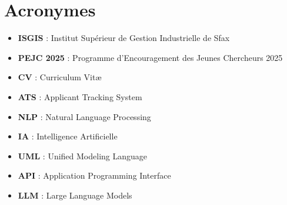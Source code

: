 \documentclass[12pt,a4paper]{report}
\begin{document}








\renewcommand{\contentsname}{Table des matières}
\tableofcontents
\newpage

\renewcommand{\listfigurename}{Table des figures}
\listoffigures
\newpage

\renewcommand{\listtablename}{Liste des tableaux}
\listoftables
\newpage

\chapter*{Acronymes}

\begin{itemize}
  \item \textbf{ISGIS} : Institut Supérieur de Gestion Industrielle de Sfax
  \item \textbf{PEJC 2025} : Programme d'Encouragement des Jeunes Chercheurs 2025
  \item \textbf{CV} : Curriculum Vitæ
  \item \textbf{ATS} : Applicant Tracking System
  \item \textbf{NLP} : Natural Language Processing
  \item \textbf{IA} : Intelligence Artificielle
  \item \textbf{UML} : Unified Modeling Language
  \item \textbf{API} : Application Programming Interface
  \item \textbf{LLM} : Large Language Models
\end{itemize}

\newpage

\end{document}
